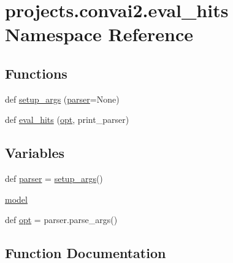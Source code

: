 \hypertarget{namespaceprojects_1_1convai2_1_1eval__hits}{}\section{projects.\+convai2.\+eval\+\_\+hits Namespace Reference}
\label{namespaceprojects_1_1convai2_1_1eval__hits}
\subsection*{Functions}
\begin{DoxyCompactItemize}
\item 
def \hyperlink{namespaceprojects_1_1convai2_1_1eval__hits_a276af35abce11628a8e697b370218cf4}{setup\+\_\+args} (\hyperlink{namespaceprojects_1_1convai2_1_1eval__hits_a51806c97f8cd28192b449237d5ade0d7}{parser}=None)
\item 
def \hyperlink{namespaceprojects_1_1convai2_1_1eval__hits_a400fd6a2e183f2cf1da6ebeff169fe70}{eval\+\_\+hits} (\hyperlink{namespaceprojects_1_1convai2_1_1eval__hits_a127b594813673d53ce8245f3235b15ca}{opt}, print\+\_\+parser)
\end{DoxyCompactItemize}
\subsection*{Variables}
\begin{DoxyCompactItemize}
\item 
def \hyperlink{namespaceprojects_1_1convai2_1_1eval__hits_a51806c97f8cd28192b449237d5ade0d7}{parser} = \hyperlink{namespaceprojects_1_1convai2_1_1eval__hits_a276af35abce11628a8e697b370218cf4}{setup\+\_\+args}()
\item 
\hyperlink{namespaceprojects_1_1convai2_1_1eval__hits_a3956f404156228d738c84aa0fe56be39}{model}
\item 
def \hyperlink{namespaceprojects_1_1convai2_1_1eval__hits_a127b594813673d53ce8245f3235b15ca}{opt} = parser.\+parse\+\_\+args()
\end{DoxyCompactItemize}


\subsection{Function Documentation}
\mbox{\label{namespaceprojects_1_1convai2_1_1eval__hits_a400fd6a2e183f2cf1da6ebeff169fe70}} 
